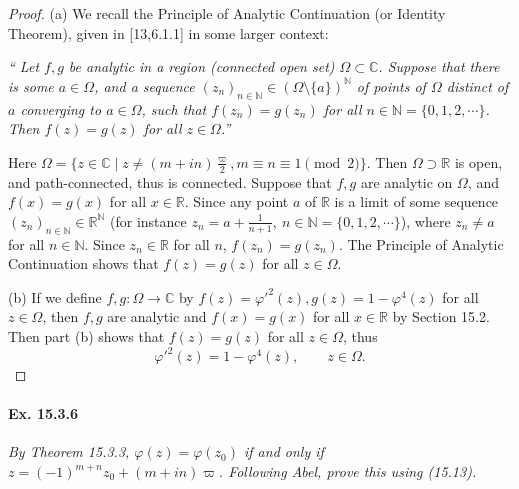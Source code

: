 \documentclass[11pt,a4paper]{article}
\newcommand{\N}{\mathbb{N}}
\newcommand{\R}{\mathbb{R}}
\newcommand{\C}{\mathbb{C}}
\begin{document}
\begin{proof} 
\item[(a)] We recall the Principle of Analytic Continuation (or Identity Theorem), given in [13,6.1.1] in some larger context:

{\it
`` Let $f,g$ be analytic in a region (connected open set) $\Omega \subset \C$. Suppose that there is some $a \in \Omega$, and a sequence $(z_n)_{n\in \N} \in (\Omega \setminus\{a\})^{\N}$ of  points of $\Omega$ distinct of $a$ converging to $a \in \Omega$, such that $f(z_n) = g(z_n)$ for all $n \in \N = \{0,1,2,\cdots\}$. Then $f(z) = g(z)$ for all $z \in \Omega$.''}

Here $\Omega = \{z \in \C \mid z \ne (m+in)\frac{\varpi}{2}, m\equiv n \equiv 1 \pmod 2\}$. Then $\Omega \supset \R$ is open, and path-connected, thus is connected. Suppose that $f,g$ are analytic on $\Omega$, and $f(x) = g(x)$ for all $x \in \R$. Since any point $a$ of $\R$ is a limit of some sequence $(z_n)_{n \in \N} \in \R^\N$ (for instance $z_n = a + \frac{1}{n+1}, \ n \in \N = \{ 0,1,2,\cdots\}$), where $z_n \ne a$ for all $n \in \N$. Since $z_n \in \R$ for all $n$, $f(z_n) = g(z_n)$. The Principle of Analytic Continuation shows that $f(z) = g(z)$ for all $z \in \Omega$.

\item[(b)] If we define $f,g : \Omega \to \C$ by $f(z) = \varphi'^2(z), g(z) = 1 - \varphi^4(z)$ for all $z \in \Omega$, then $f,g$ are analytic and $f(x) = g(x) $ for all $x \in \R$ by Section 15.2. Then part (b) shows that $f(z) = g(z)$ for all $z \in \Omega$, thus
$$\varphi'^2(z) = 1 - \varphi^4(z),\qquad z \in \Omega.$$
\end{proof} 

\paragraph{Ex. 15.3.6}{\it By Theorem 15.3.3, $\varphi(z) = \varphi(z_0)$ if and only if $z = (-1)^{m+n} z_0 + (m + in) \varpi$. Following Abel, prove this using (15.13).
}
\end{document}
